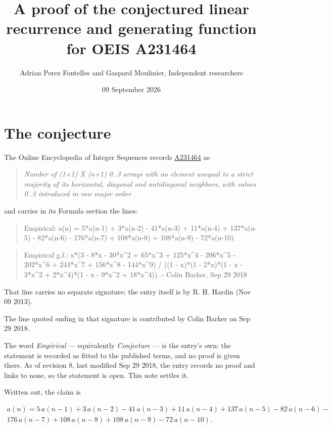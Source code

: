 \documentclass[11pt]{article}
\title{A proof of the conjectured linear recurrence and generating function for OEIS A231464}
\author{Adrian Perez Fontelles and Gaspard Moulinier, Independent researchers}
\date{09 September 2026}
\theoremstyle{definition}
\begin{document}
\maketitle
\section{The conjecture}

The Online Encyclopedia of Integer Sequences records \href{https://oeis.org/A231464}{A231464} as

\begin{quote}\itshape Number of (1+1) X (n+1) 0..3 arrays with no element unequal to a strict majority of its horizontal, diagonal and antidiagonal neighbors, with values 0..3 introduced in row major order\end{quote}

and carries in its Formula section the lines:

\begin{quote}\ttfamily Empirical: a(n) = 5*a(n-1) + 3*a(n-2) - 41*a(n-3) + 11*a(n-4) + 137*a(n-5) - 82*a(n-6) - 176*a(n-7) + 108*a(n-8) + 108*a(n-9) - 72*a(n-10).\end{quote}

\begin{quote}\ttfamily Empirical g.f.: x*(3 - 8*x - 30*x\textasciicircum{}2 + 65*x\textasciicircum{}3 + 125*x\textasciicircum{}4 - 206*x\textasciicircum{}5 - 202*x\textasciicircum{}6 + 244*x\textasciicircum{}7 + 156*x\textasciicircum{}8 - 144*x\textasciicircum{}9) / ((1 - x)*(1 - 2*x)*(1 - x - 3*x\textasciicircum{}2 + 2*x\textasciicircum{}4)*(1 - x - 9*x\textasciicircum{}2 + 18*x\textasciicircum{}4)). - Colin Barker, Sep 29 2018\end{quote}

That line carries no separate signature; the entry itself is by R. H. Hardin (Nov 09 2013).

The line quoted ending in that signature is contributed by Colin Barker on Sep 29 2018.

The word {\itshape Empirical} --- equivalently {\itshape Conjecture} --- is the entry's own: the statement is recorded as fitted to the published terms, and no proof is given there. As of revision 8, last modified Sep 29 2018, the entry records no proof and links to none, so the statement is open. This note settles it.

Written out, the claim is

\begin{multline*} a(n) = 5\,a(n-1) + 3\,a(n-2) - 41\,a(n-3) + 11\,a(n-4) + 137\,a(n-5) - 82\,a(n-6) - \\ 176\,a(n-7) + 108\,a(n-8) + 108\,a(n-9) - 72\,a(n-10). \end{multline*}
\end{document}
